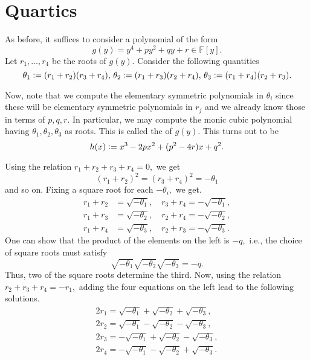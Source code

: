 \section{Quartics}

As before, it suffices to consider a polynomial of the form
\begin{equation*} 
	g(y) = y^4 + py^2 + qy + r \in \mathbb{F}[y].
\end{equation*}
Let $r_1, \ldots, r_4$ be the roots of $g(y).$ Consider the following quantities
\begin{equation*} 
	\theta_1 \vcentcolon= (r_1 + r_2)(r_3 + r_4),\, \theta_2 \vcentcolon= (r_1 + r_3)(r_2 + r_4),\, \theta_3 \vcentcolon= (r_1 + r_4)(r_2 + r_3).
\end{equation*}

Now, note that we compute the elementary symmetric polynomials in $\theta_i$ since these will be elementary symmetric polynomials in $r_j$ and we already know those in terms of $p, q, r.$ In particular, we may compute the monic cubic polynomial having $\theta_1, \theta_2, \theta_3$ as roots. This is called the  of $g(y).$ This turns out to be
\begin{equation*} 
	h(x) \vcentcolon= x^3 - 2px^2 + (p^2 - 4r)x + q^2.
\end{equation*}

Using the relation $r_1 + r_2 + r_3 + r_4 = 0,$ we get 
\begin{equation*} 
	(r_1 + r_2)^2 = (r_3 + r_4)^2 = -\theta_1
\end{equation*} 
and so on. Fixing a square root for each $-\theta_i,$ we get.
\begin{align*} 
	r_1 + r_2 &= \sqrt{-\theta_1}, \quad r_3 + r_4 = -\sqrt{-\theta_1}, \\
	r_1 + r_3 &= \sqrt{-\theta_2}, \quad r_2 + r_4 = -\sqrt{-\theta_2}, \\
	r_1 + r_4 &= \sqrt{-\theta_3}, \quad r_2 + r_3 = -\sqrt{-\theta_3}.
\end{align*}
One can show that the product of the elements on the left is $-q,$ i.e., the choice of square roots must satisfy
\begin{equation*} 
	\sqrt{-\theta_1}\sqrt{-\theta_2}\sqrt{-\theta_3} = -q.
\end{equation*}
Thus, two of the square roots determine the third. Now, using the relation $r_2 + r_3 + r_4 = -r_1,$ adding the four equations on the left lead to the following solutions.
\begin{align*} 
	2r_1 =  \sqrt{-\theta_1} + \sqrt{-\theta_2} + \sqrt{-\theta_3}, \\
	2r_2 =  \sqrt{-\theta_1} - \sqrt{-\theta_2} - \sqrt{-\theta_3}, \\
	2r_3 = -\sqrt{-\theta_1} + \sqrt{-\theta_2} - \sqrt{-\theta_3}, \\
	2r_4 = -\sqrt{-\theta_1} - \sqrt{-\theta_2} + \sqrt{-\theta_3}.
\end{align*}

